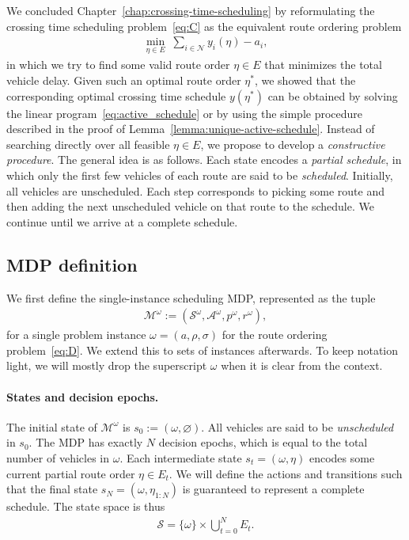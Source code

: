\documentclass{report}
\theoremstyle{definition}
\theoremstyle{plain}
\begin{document}
We concluded Chapter~\ref{chap:crossing-time-scheduling} by
reformulating the crossing time scheduling problem~\eqref{eq:C} as the equivalent route
ordering problem
\begin{align}
  \label{eq:D-repeat}\tag{D}
  \min_{\eta \in E} \; \sum_{i \in \mathcal{N}} y_i(\eta) - a_i ,
\end{align}
in which we try to find some valid route order $\eta \in E$ that minimizes the total
vehicle delay.
%
Given such an optimal route order $\eta^*$, we showed that the corresponding
optimal crossing time schedule $y(\eta^*)$ can be obtained by solving the linear
program~\eqref{eq:active_schedule} or by using the simple procedure described in the proof of
Lemma~\ref{lemma:unique-active-schedule}.
%
Instead of searching directly over all feasible $\eta \in E$, we propose to develop a
\emph{constructive procedure}.
The general idea is as follows.
%
Each state encodes a \emph{partial schedule}, in which only the first few
vehicles of each route are said to be \emph{scheduled}.
%
Initially, all vehicles are unscheduled.
%
Each step corresponds to picking some route and then adding the next unscheduled
vehicle on that route to the schedule.
%
We continue until we arrive at a complete schedule.


\subsection{MDP definition}

We first define the single-instance scheduling MDP, represented as the tuple
\begin{align}
  \mathcal{M}^\omega := (\mathcal{S}^\omega, \mathcal{A}^\omega, p^\omega, r^\omega) ,
\end{align}
for a single problem instance $\omega = (a, \rho, \sigma)$ for the route
ordering problem~\eqref{eq:D}.
%
We extend this to sets of instances afterwards.
%
To keep notation light, we will mostly drop the superscript $\omega$ when it is clear
from the context.

\paragraph{States and decision epochs.}
The initial state of $\mathcal{M}^\omega$ is $s_0 := (\omega, \varnothing)$. All vehicles
are said to be \emph{unscheduled} in $s_0$.
The MDP has exactly $N$ decision epochs, which is equal to the total number of
vehicles in $\omega$.
%
Each intermediate state $s_t = (\omega, \eta)$ encodes some current partial route
order $\eta \in E_t$.
%
We will define the actions and transitions such that the final state
$s_N = (\omega, \eta_{1:N})$ is guaranteed to represent a complete schedule.
%
The state space is thus
\begin{align}
  \mathcal{S} = \{\omega\} \times \bigcup_{t=0}^N E_t .
\end{align}
\end{document}
